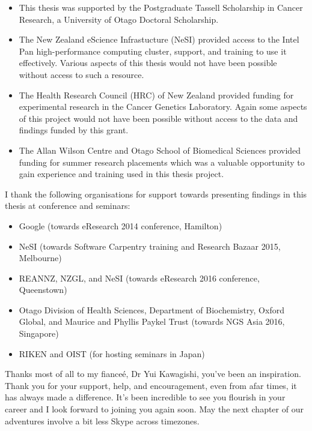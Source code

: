 \begin{itemize}
\item
This thesis was supported by the Postgraduate Tassell Scholarship in Cancer Research, a University of Otago Doctoral Scholarship.

\item
The New Zealand eScience Infrastucture (NeSI) provided access to the Intel Pan high-performance computing cluster, support, and training to use it effectively. Various aspects of this thesis would not have been possible without access to such a resource. 

\item
The Health Research Council (HRC) of New Zealand provided funding for experimental research in the Cancer Genetics Laboratory. Again some aspects of this project would not have been possible without access to the data and findings funded by this grant.

\item
The Allan Wilson Centre and Otago School of Biomedical Sciences provided funding for summer research placements which was a valuable opportunity to gain experience and training used in this thesis project.

\end{itemize}

I thank the following organisations for support towards presenting findings in this thesis at conference and seminars:

\begin{itemize}

\item
Google (towards eResearch 2014 conference, Hamilton)

\item
NeSI (towards Software Carpentry training and Research Bazaar 2015, Melbourne)

\item
REANNZ, NZGL, and NeSI (towards eResearch 2016 conference, Queenstown)

\item
Otago Division of Health Sciences, Department of Biochemistry, Oxford Global, and Maurice and Phyllis Paykel Trust (towards NGS Asia 2016, Singapore)

\item
RIKEN and OIST (for hosting seminars in Japan)

\end{itemize}

Thanks most of all to my fiance\'{e}, Dr Yui Kawagishi, you've been an inspiration. Thank you for your support, help, and encouragement, even from afar times, it has always made a difference. It's been incredible to see you flourish in your career and I look forward to joining you again soon. May the next chapter of our adventures involve a bit less Skype across timezones.
